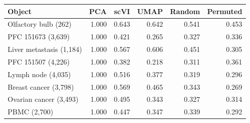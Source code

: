 \begin{tabular}{lrrrrr}
\toprule
Object & PCA & scVI & UMAP & Random & Permuted \\
\midrule
Olfactory bulb (262) & 1.000 & 0.643 & 0.642 & 0.541 & 0.453 \\
PFC 151673 (3{,}639) & 1.000 & 0.421 & 0.265 & 0.327 & 0.336 \\
Liver metastasis (1{,}184) & 1.000 & 0.567 & 0.606 & 0.451 & 0.305 \\
PFC 151507 (4{,}226) & 1.000 & 0.382 & 0.218 & 0.311 & 0.361 \\
Lymph node (4{,}035) & 1.000 & 0.516 & 0.377 & 0.319 & 0.296 \\
Breast cancer (3{,}798) & 1.000 & 0.569 & 0.465 & 0.343 & 0.269 \\
Ovarian cancer (3{,}493) & 1.000 & 0.495 & 0.343 & 0.327 & 0.314 \\
PBMC (2{,}700) & 1.000 & 0.447 & 0.347 & 0.339 & 0.292 \\
\bottomrule
\end{tabular}
